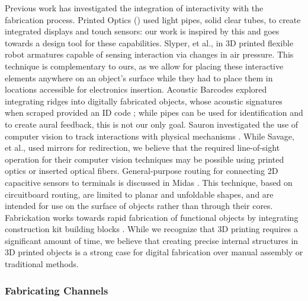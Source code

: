 Previous work has investigated the integration of interactivity with the fabrication process.  Printed Optics (\cite{Willis-printedoptics}) used light pipes, solid clear tubes, to create integrated displays and touch sensors: our work is inspired by this and goes towards a design tool for these capabilities.  Slyper, et al., in \cite{Slyper-pressure} 3D printed flexible robot armatures capable of sensing interaction via changes in air pressure.  This technique is complementary to ours, as we allow for placing these interactive elements anywhere on an object's surface while they had to place them in locations accessible for electronics insertion. Acoustic Barcodes explored integrating ridges into digitally fabricated objects, whose acoustic signatures when scraped provided an ID code \cite{Harrison-acoustic}; while pipes can be used for identification and to create aural feedback, this is not our only goal.   Sauron investigated the use of computer vision to track interactions with physical mechanisms \cite{Savage-sauron}.  While Savage, et al., used mirrors for redirection, we believe that the required line-of-sight operation for their computer vision techniques may be possible using printed optics or inserted optical fibers.  General-purpose routing for connecting 2D capacitive sensors to terminals is discussed in Midas \cite{Savage-midas}.  This technique, based on circuitboard routing, are limited to planar and unfoldable shapes, and are intended for use on the surface of objects rather than through their cores.  Fabrickation works towards rapid fabrication of functional objects by integrating construction kit building blocks \cite{Mueller-fabrickation}.  While we recognize that 3D printing requires a significant amount of time, we believe that creating precise internal structures in 3D printed objects is a strong case for digital fabrication over manual assembly or traditional methods.

\subsubsection{Fabricating Channels}

